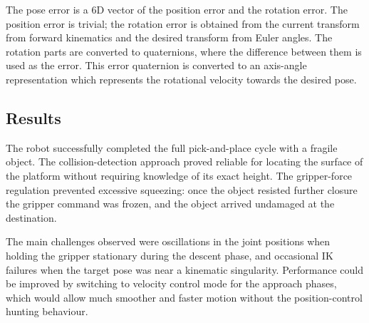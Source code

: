\documentclass[12pt,a4paper]{article}
\begin{document}
The pose error is a 6D vector of the position error and the rotation error.  The position
error is trivial; the rotation error is obtained from the current transform from forward
kinematics and the desired transform from Euler angles.  The rotation parts are converted to
quaternions, where the difference between them is used as the error.  This error quaternion
is converted to an axis-angle representation which represents the rotational velocity towards
the desired pose.

\subsection*{Results}

The robot successfully completed the full pick-and-place cycle with a fragile object.  The
collision-detection approach proved reliable for locating the surface of the platform without
requiring knowledge of its exact height.  The gripper-force regulation prevented excessive
squeezing: once the object resisted further closure the gripper command was frozen, and the
object arrived undamaged at the destination.

The main challenges observed were oscillations in the joint positions when holding the
gripper stationary during the descent phase, and occasional IK failures when the target
pose was near a kinematic singularity.  Performance could be improved by switching to
velocity control mode for the approach phases, which would allow much smoother and faster
motion without the position-control hunting behaviour.
\end{document}
